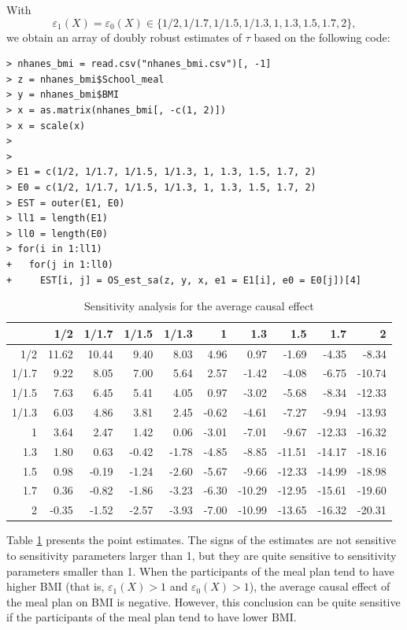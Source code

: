 With 
$$
\varepsilon_1(X) = \varepsilon_0(X) \in \{1/2, 1/1.7, 1/1.5, 1/1.3, 1, 1.3, 1.5, 1.7, 2\},
$$ 
we obtain an array of doubly robust estimates of $\tau$ based on the following  code:
\begin{lstlisting}
> nhanes_bmi = read.csv("nhanes_bmi.csv")[, -1]
> z = nhanes_bmi$School_meal
> y = nhanes_bmi$BMI
> x = as.matrix(nhanes_bmi[, -c(1, 2)])
> x = scale(x)
> 
> 
> E1 = c(1/2, 1/1.7, 1/1.5, 1/1.3, 1, 1.3, 1.5, 1.7, 2)
> E0 = c(1/2, 1/1.7, 1/1.5, 1/1.3, 1, 1.3, 1.5, 1.7, 2)
> EST = outer(E1, E0)
> ll1 = length(E1)
> ll0 = length(E0)
> for(i in 1:ll1)
+   for(j in 1:ll0)
+     EST[i, j] = OS_est_sa(z, y, x, e1 = E1[i], e0 = E0[j])[4]
\end{lstlisting}




\begin{table}[ht]
\centering
\caption{Sensitivity analysis for the average causal effect}\label{table::sensitivity-ACE}
\begin{tabular}{rrrrrrrrrr}
  \hline
 & 1/2 & 1/1.7 & 1/1.5 & 1/1.3 & 1 & 1.3 & 1.5 & 1.7 & 2 \\ 
  \hline
1/2 & 11.62 & 10.44 & 9.40 & 8.03 & 4.96 & 0.97 & -1.69 & -4.35 & -8.34 \\ 
  1/1.7 & 9.22 & 8.05 & 7.00 & 5.64 & 2.57 & -1.42 & -4.08 & -6.75 & -10.74 \\ 
  1/1.5 & 7.63 & 6.45 & 5.41 & 4.05 & 0.97 & -3.02 & -5.68 & -8.34 & -12.33 \\ 
  1/1.3 & 6.03 & 4.86 & 3.81 & 2.45 & -0.62 & -4.61 & -7.27 & -9.94 & -13.93 \\ 
  1 & 3.64 & 2.47 & 1.42 & 0.06 & -3.01 & -7.01 & -9.67 & -12.33 & -16.32 \\ 
  1.3 & 1.80 & 0.63 & -0.42 & -1.78 & -4.85 & -8.85 & -11.51 & -14.17 & -18.16 \\ 
  1.5 & 0.98 & -0.19 & -1.24 & -2.60 & -5.67 & -9.66 & -12.33 & -14.99 & -18.98 \\ 
  1.7 & 0.36 & -0.82 & -1.86 & -3.23 & -6.30 & -10.29 & -12.95 & -15.61 & -19.60 \\ 
  2 & -0.35 & -1.52 & -2.57 & -3.93 & -7.00 & -10.99 & -13.65 & -16.32 & -20.31 \\ 
   \hline
\end{tabular}
\end{table}


Table \ref{table::sensitivity-ACE} presents the point estimates.  
The signs of the estimates are not sensitive to sensitivity parameters larger than 1, but they are quite sensitive to sensitivity parameters smaller than 1. When the participants of the meal plan tend to have higher BMI (that is, $\varepsilon_1(X) >1$ and $ \varepsilon_0(X)  > 1$), the average causal effect of the meal plan on BMI is negative. However, this conclusion can be quite sensitive if the participants of the meal plan tend to have lower BMI. 



